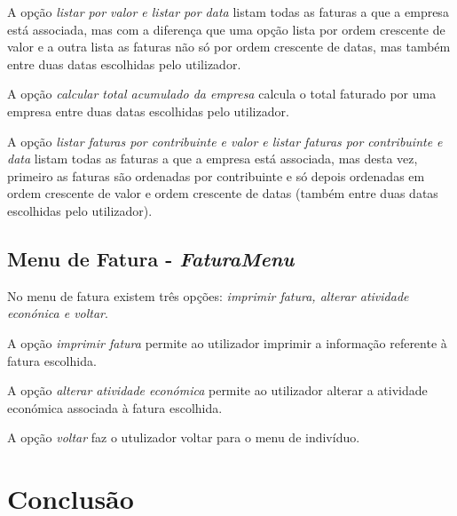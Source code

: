 \documentclass[12pt]{report}
\newcommand\tab[1][0.5cm]{\hspace*{#1}}
\begin{document}
A opção \textit{listar por valor e listar por data} listam todas as faturas a que a empresa está associada, mas com a diferença que uma opção lista por ordem crescente de valor e a outra lista as faturas não só por ordem crescente de datas, mas também entre duas datas escolhidas pelo utilizador.

A opção \textit{calcular total acumulado da empresa} calcula o total faturado por uma empresa entre duas datas escolhidas pelo utilizador.

A opção \textit{listar faturas por contribuinte e valor e listar faturas por contribuinte e data} listam todas as faturas a que a empresa está associada, mas desta vez, primeiro as faturas são ordenadas por contribuinte e só depois ordenadas em ordem crescente de valor e ordem crescente de datas (também entre duas datas escolhidas pelo utilizador).
\section{Menu de Fatura - \textit{FaturaMenu}}
\tab No menu de fatura existem três opções: \textit{imprimir fatura, alterar atividade econónica e voltar}.

A opção \textit{imprimir fatura} permite ao utilizador imprimir a informação referente à fatura escolhida.

A opção \textit{alterar atividade económica} permite ao utilizador alterar a atividade económica associada à fatura escolhida.

A opção \textit{voltar} faz o utulizador voltar para o menu de indivíduo.

\chapter{Conclusão}
\label{sec:conclusao}
\end{document}

